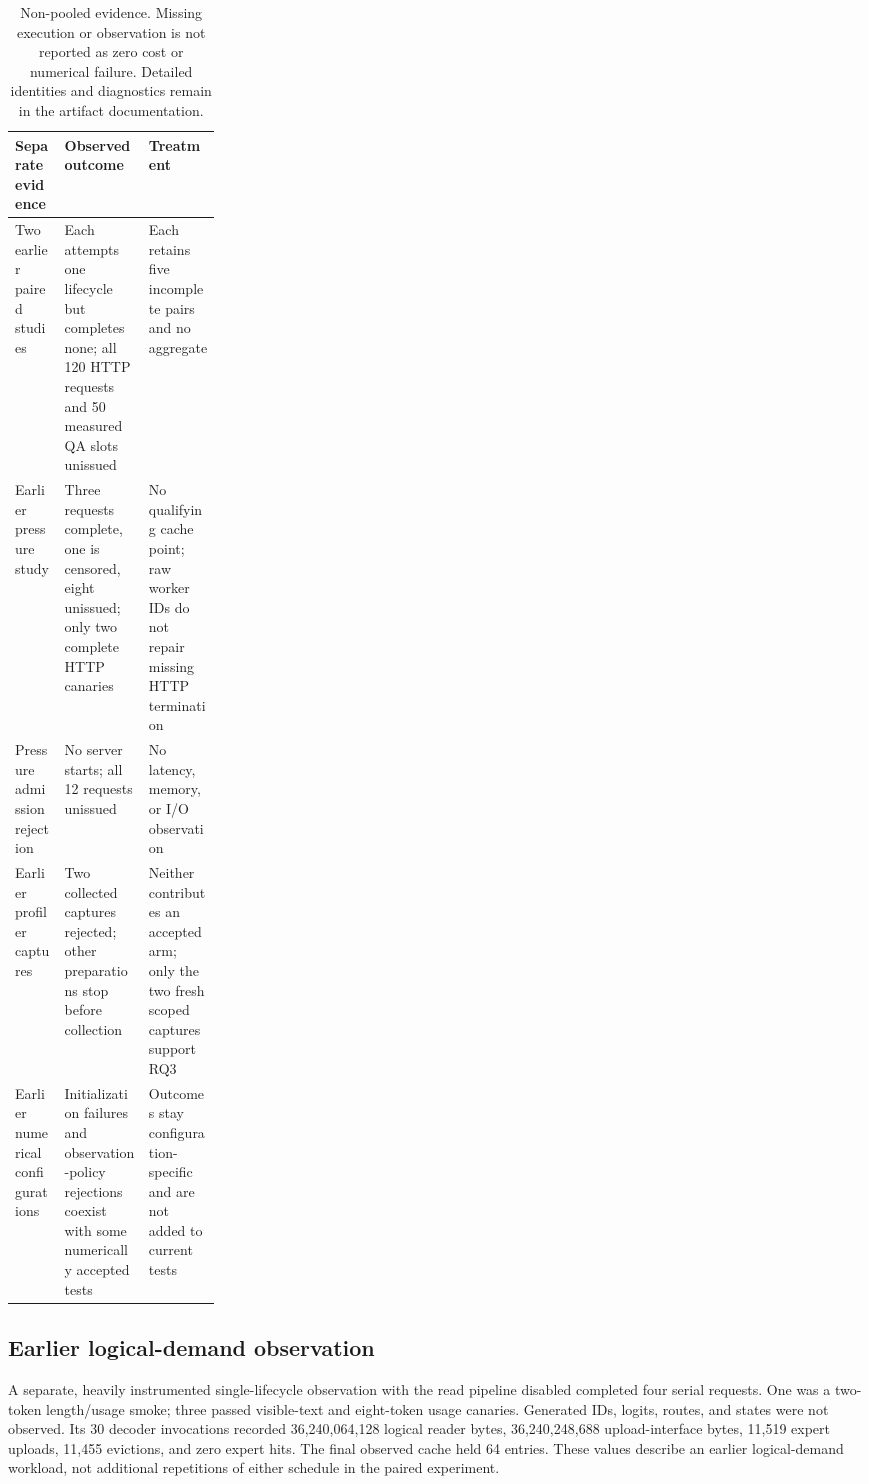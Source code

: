 \begin{table}[H]
\centering
\small
\begin{tabularx}{\linewidth}{@{}p{0.24\linewidth}>{\raggedright\arraybackslash}X>{\raggedright\arraybackslash}X@{}}
\toprule
Separate evidence & Observed outcome & Treatment \\
\midrule
Two earlier paired studies & Each attempts one lifecycle but completes none; all 120 HTTP requests and 50 measured QA slots unissued & Each retains five incomplete pairs and no aggregate \\
Earlier pressure study & Three requests complete, one is censored, eight unissued; only two complete HTTP canaries & No qualifying cache point; raw worker IDs do not repair missing HTTP termination \\
Pressure admission rejection & No server starts; all 12 requests unissued & No latency, memory, or I/O observation \\
Earlier profiler captures & Two collected captures rejected; other preparations stop before collection & Neither contributes an accepted arm; only the two fresh scoped captures support RQ3 \\
Earlier numerical configurations & Initialization failures and observation-policy rejections coexist with some numerically accepted tests & Outcomes stay configuration-specific and are not added to current tests \\
\bottomrule
\end{tabularx}
\caption{Non-pooled evidence. Missing execution or observation is not reported
as zero cost or numerical failure. Detailed identities and diagnostics remain
in the artifact documentation.}
\label{tab:separate-evidence}
\end{table}

\subsection{Earlier logical-demand observation}
\label{sec:tp1-storage-middle}
A separate, heavily instrumented single-lifecycle observation with the read
pipeline disabled completed four serial requests. One was a two-token
length/usage smoke; three passed visible-text and eight-token usage canaries.
Generated IDs, logits, routes, and states were not observed. Its 30 decoder
invocations recorded 36,240,064,128 logical reader bytes, 36,240,248,688
upload-interface bytes, 11,519 expert uploads, 11,455 evictions, and zero
expert hits. The final observed cache held 64 entries. These values describe
an earlier logical-demand workload, not additional repetitions of either
schedule in the paired experiment.

